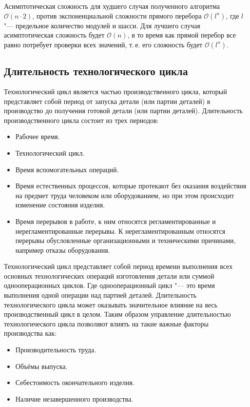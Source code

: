 Асимптотическая сложность для худшего случая полученного алгоритма $\mathcal{O}(n \cdot 2)$, против экспоненциальной сложности прямого перебора $\mathcal{O}(l^n)$, где $l$ "--- предельное количество модулей и шасси.
Для лучшего случая асимптотическая сложность будет $\mathcal{O}(n)$, в то время как прямой перебор все равно потребует проверки всех значений, т.\,е. его сложность будет $\mathcal{O}(l^n)$.


\subsection{Длительность технологического цикла}

Технологический цикл является частью производственного цикла, который представляет собой период от запуска детали (или партии деталей) в производство до получения готовой детали (или партии деталей). Длительность производственного цикла состоит из трех периодов:

\begin{itemize}
	\item Рабочее время.
	\item Технологический цикл.
	\item Время вспомогательных операций.
	\item Время естественных процессов, которые протекают без оказания воздействия на предмет труда человеком или оборудованием, но при этом происходит изменение состояния изделия.
	\item Время перерывов в работе, к ним относятся регламентированные и нерегламентированные перерывы. К нерегламентированным относятся перерывы обусловленные организационными и техническими причинами, например отказы оборудования.
\end{itemize}

Технологический цикл представляет собой период времени выполнения  всех основных технологических операций изготовления детали или суммой однооперационных циклов. Где однооперационный цикл "--- это время выполнения одной операции над партией деталей. Длительность технологического цикла может оказывать значительное влияние на весь производственный цикл в целом. Таким образом управление длительностью технологического цикла позволяют влиять на такие важные факторы производства как:

\begin{itemize}
	\item Производительность труда.
	\item Объёмы выпуска.
	\item Себестоимость окончательного изделия.
	\item Наличие незавершенного производства.
\end{itemize}

